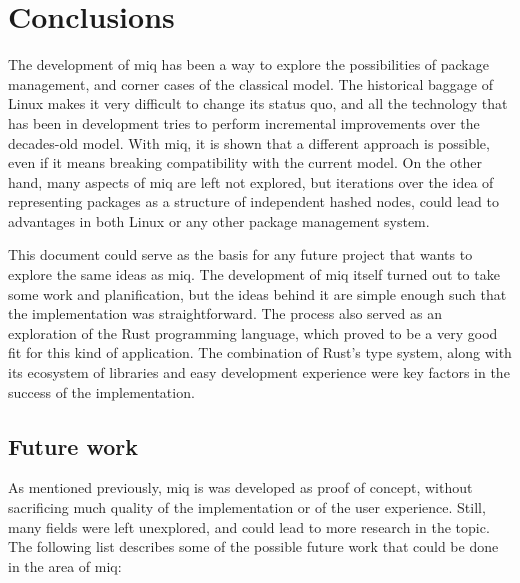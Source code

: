 \chapter{Conclusions}

The development of miq has been a way to
explore the possibilities of package management,
and corner cases of the classical model. The
historical baggage of Linux makes it very difficult
to change its status quo, and all the technology
that has been in development tries to perform
incremental improvements over the decades-old
model. With miq, it is shown that a different
approach is possible, even if it means breaking
compatibility with the current model. On the
other hand, many aspects of miq are left not
explored, but iterations over the idea of representing
packages as a structure of independent hashed
nodes, could lead to advantages in both Linux or
any other package management system.

This document could serve as the basis for any future project
that wants to explore the same ideas as miq. The
development of miq itself turned out to take some work
and planification, but the ideas behind it are simple enough
such that the implementation was straightforward. The
process also served as an exploration of the Rust
programming language, which proved to be a very good fit for
this kind of application. The combination of Rust's type
system, along with its ecosystem of libraries and easy
development experience were key factors in the success of
the implementation.

\section{Future work}

As mentioned previously, miq is was developed as proof of
concept, without sacrificing much quality of the
implementation or of the user experience. Still, many fields
were left unexplored, and could lead to more research in the
topic. The following list describes some of the possible
future work that could be done in the area of miq:

